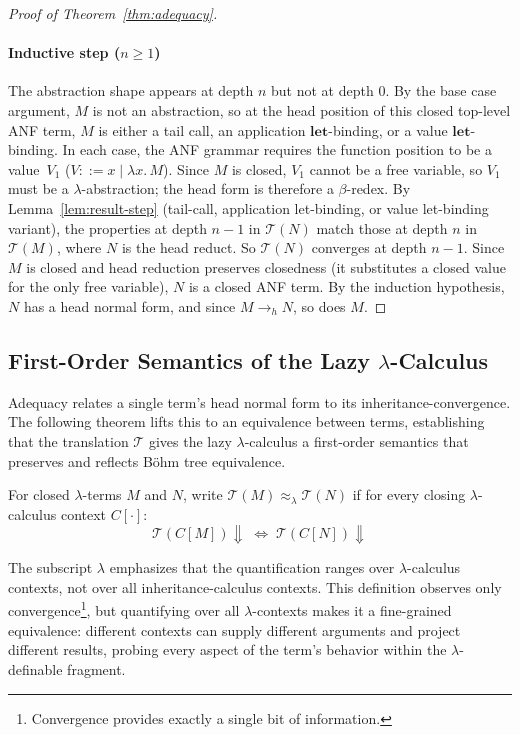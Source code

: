 \begin{proof}[Proof of Theorem~\ref{thm:adequacy}]
  \paragraph{Inductive step ($n \ge 1$)}
  The abstraction shape
  appears at depth $n$ but not at depth $0$.
  By the base case argument, $M$ is not an abstraction, so at the
  head position of this closed top-level ANF term, $M$ is either
  a tail call, an application $\mathbf{let}$-binding, or a value
  $\mathbf{let}$-binding.
  In each case, the ANF grammar requires the function
  position to be a value~$V_1$
  ($V ::= x \mid \lambda x.\, M$).
  Since $M$ is closed, $V_1$ cannot be a free variable,
  so $V_1$ must be a $\lambda$-abstraction;
  the head form is therefore a $\beta$-redex.
  By Lemma~\ref{lem:result-step} (tail-call,
    application let-binding, or value let-binding
  variant), the properties at depth
  $n - 1$ in $\mathcal{T}(N)$ match those at depth $n$
  in $\mathcal{T}(M)$, where $N$ is the head reduct.
  So $\mathcal{T}(N)$ converges at depth $n - 1$.
  Since $M$ is closed and head reduction preserves
  closedness (it substitutes a closed value for the only
  free variable), $N$ is a closed ANF term.
  By the induction hypothesis, $N$ has a head normal
  form, and since $M \to_h N$, so does $M$.
\end{proof}

\subsection{First-Order Semantics of the Lazy \texorpdfstring{$\lambda$}{λ}-Calculus}

Adequacy relates a single term's head normal form to its
inheritance-convergence.
The following theorem lifts this to an equivalence between
terms, establishing that the translation $\mathcal{T}$
gives the lazy $\lambda$-calculus a first-order semantics
that preserves and reflects B\"ohm tree equivalence.

\begin{definition}%
  \label{def:ctx-equiv}
  For closed $\lambda$-terms $M$ and $N$, write
  $\mathcal{T}(M) \approx_\lambda \mathcal{T}(N)$ if for every
  closing $\lambda$-calculus context $C[\cdot]$:
  \[
    \mathcal{T}(C[M]){\Downarrow}
    \;\Longleftrightarrow\;
    \mathcal{T}(C[N]){\Downarrow}
  \]
\end{definition}

\noindent
The subscript $\lambda$ emphasizes that the quantification ranges
over $\lambda$-calculus contexts, not over all inheritance-calculus contexts.
This definition observes only convergence\footnote{
  Convergence provides exactly a single bit of information.
}, but
quantifying over all $\lambda$-contexts makes it a fine-grained
equivalence: different contexts can supply different arguments
and project different results, probing every aspect of the
term's behavior within the $\lambda$-definable fragment.

